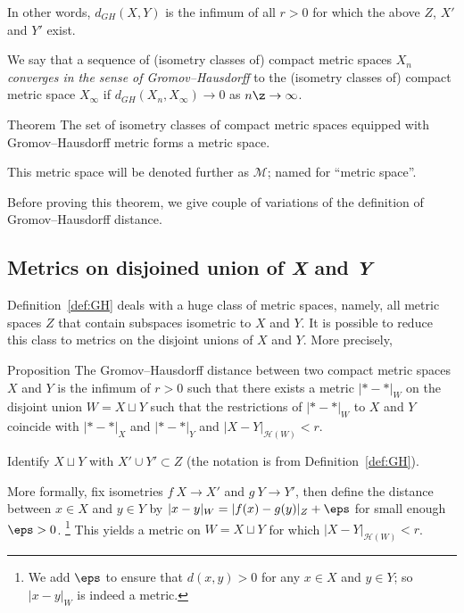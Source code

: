 In other words, $d_{GH} (X, Y )$ is
the infimum of all $r>0$ for which the above $Z$, $X'$ and $Y'$ exist. 


We say that a sequence
of (isometry classes of) compact metric spaces $X_n$ 
\emph{converges in the sense of Gromov--Hausdorff} to the (isometry classes of)
compact metric space $X_\infty$ if $d_{GH}(X_n , X_\infty) \to 0$ as $n\z\to\infty$.



\begin{thm}{Theorem}\label{thm:GH-is-a-metric}
The set of isometry classes of compact metric spaces equipped with Gromov--Hausdorff metric forms a metric space.

This metric space will be denoted further as $\mathcal{M}$; named for ``metric space''.
\end{thm}

Before proving this theorem, we give couple of variations 
of the definition of Gromov--Hausdorff distance.

\subsection*{Metrics on disjoined union of \textit{X} and \textit{Y}}


Definition~\ref{def:GH} deals with a huge class of metric spaces,
namely, all metric spaces $Z$ that contain subspaces isometric to $X$ and $Y$.
It is possible to reduce this class to metrics on the disjoint unions of $X$ and $Y$. 
More precisely, 

\begin{thm}{Proposition}\label{prop:GH=X+Y}
The Gromov--Hausdorff distance between two compact metric spaces $X$
and $Y$ is the infimum of $r > 0$ such that there exists a metric
$|{*}-{*}|_W$ on the disjoint union $W=X\sqcup Y$ 
such that the restrictions of $|{*}-{*}|_W$ to $X$ and $Y$
coincide with $|{*}-{*}|_X$ and $|{*}-{*}|_Y$ 
and $|X-Y|_{\mathcal{H}(W)}  < r$. 
\end{thm}


Identify $X\sqcup Y$ with $X'\cup Y' \subset Z$ 
(the notation
is from Definition~\ref{def:GH}). 

More formally, fix isometries $f\: X \to X'$ and
$g\: Y \to Y'$, then define the distance between $x \in X$ and $y \in Y$ by
$|x-y|_W = |f (x)- g(y)|_Z+\eps$ for small enough $\eps>0$.%
\footnote{We add $\eps$ to ensure that $d(x, y) > 0$ for any $x\in X$ and $y\in Y$;
so $|x-y|_W$ is indeed a metric.}
This yields a metric on $W=X\sqcup Y$ for which
$|X-Y|_{\mathcal{H}(W)} < r$.
\qeds
 

